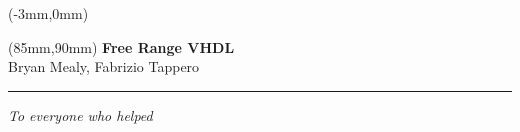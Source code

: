 \documentclass[11pt,b5paper]{book} %
\begin{document}

	\thispagestyle{empty}
	\begin{textblock*}{160mm}(-3mm,0mm)
	\noindent{}  %
	\end{textblock*}
	\null\newpage %

	\thispagestyle{empty}
	\null\newpage

	\thispagestyle{empty}
	\begin{textblock*}{60mm}(85mm,90mm)
	\noindent
	{\sffamily\LARGE\bfseries Free Range VHDL}\\
	\noindent
	{\sffamily\small Bryan Mealy, Fabrizio Tappero}\\
	{\color{dark-gray}\rule[5pt]{170pt}{3pt}}
	\end{textblock*}
	\null\newpage

	\thispagestyle{empty}
	

	\thispagestyle{empty}
	\null
	\vspace*{\fill}
	\hfill\textit{To everyone who helped}
	\vspace*{\fill}
	\newpage

	\thispagestyle{empty}
	\null\newpage

	\renewcommand\contentsname{Table of Contents} %
	\tableofcontents

	

	\thispagestyle{empty}
	\null\newpage

	\setcounter{page}{1}
	

	
	
	
	
	
	
	
	
	
	
	
	
	
    \begin{appendices}
	    
	    
    \end{appendices}

	\thispagestyle{empty}
	\null\newpage

\end{document}

